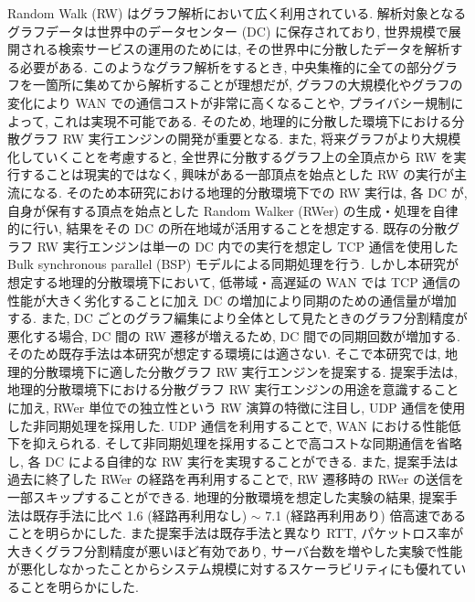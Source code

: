 Random Walk (RW) はグラフ解析において広く利用されている. 解析対象となるグラフデータは世界中のデータセンター (DC) に保存されており, 世界規模で展開される検索サービスの運用のためには, その世界中に分散したデータを解析する必要がある. このようなグラフ解析をするとき, 中央集権的に全ての部分グラフを一箇所に集めてから解析することが理想だが, グラフの大規模化やグラフの変化により WAN での通信コストが非常に高くなることや, プライバシー規制によって, これは実現不可能である. そのため, 地理的に分散した環境下における分散グラフ RW 実行エンジンの開発が重要となる. 
また, 将来グラフがより大規模化していくことを考慮すると, 全世界に分散するグラフ上の全頂点から RW を実行することは現実的ではなく, 興味がある一部頂点を始点とした RW の実行が主流になる. そのため本研究における地理的分散環境下での RW 実行は, 各 DC が, 自身が保有する頂点を始点とした Random Walker (RWer) の生成・処理を自律的に行い, 結果をその DC の所在地域が活用することを想定する. 
既存の分散グラフ RW 実行エンジンは単一の DC 内での実行を想定し TCP 通信を使用した Bulk synchronous parallel (BSP) モデルによる同期処理を行う. しかし本研究が想定する地理的分散環境下において, 低帯域・高遅延の WAN では TCP 通信の性能が大きく劣化することに加え DC の増加により同期のための通信量が増加する. また,  DC ごとのグラフ編集により全体として見たときのグラフ分割精度が悪化する場合, DC 間の RW 遷移が増えるため, DC 間での同期回数が増加する. そのため既存手法は本研究が想定する環境には適さない. 
そこで本研究では, 地理的分散環境下に適した分散グラフ RW 実行エンジンを提案する. 提案手法は, 地理的分散環境下における分散グラフ RW 実行エンジンの用途を意識することに加え, RWer 単位での独立性という RW 演算の特徴に注目し, UDP 通信を使用した非同期処理を採用した. UDP 通信を利用することで, WAN における性能低下を抑えられる. そして非同期処理を採用することで高コストな同期通信を省略し, 各 DC による自律的な RW 実行を実現することができる. また, 提案手法は過去に終了した RWer の経路を再利用することで, RW 遷移時の RWer の送信を一部スキップすることができる.
地理的分散環境を想定した実験の結果, 提案手法は既存手法に比べ 1.6 (経路再利用なし) $\sim$ 7.1 (経路再利用あり) 倍高速であることを明らかにした. また提案手法は既存手法と異なり RTT, パケットロス率が大きくグラフ分割精度が悪いほど有効であり, サーバ台数を増やした実験で性能が悪化しなかったことからシステム規模に対するスケーラビリティにも優れていることを明らかにした. 


\vspace{36pt}
\thispagestyle{empty}
\clearpage